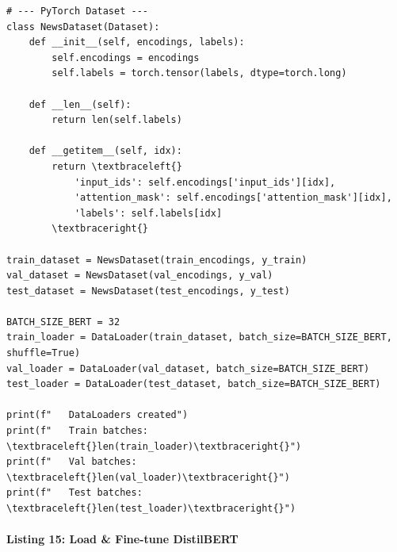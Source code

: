 \documentclass[12pt,a4paper,oneside]{report}
\begin{document}
\begin{Verbatim}[commandchars=\\\{\},breaklines=true,breakanywhere=true,fontsize=\scriptsize,frame=leftline,framesep=2mm,rulecolor=\color{gray}]
# --- PyTorch Dataset ---
class NewsDataset(Dataset):
    def __init__(self, encodings, labels):
        self.encodings = encodings
        self.labels = torch.tensor(labels, dtype=torch.long)

    def __len__(self):
        return len(self.labels)

    def __getitem__(self, idx):
        return \textbraceleft{}
            'input_ids': self.encodings['input_ids'][idx],
            'attention_mask': self.encodings['attention_mask'][idx],
            'labels': self.labels[idx]
        \textbraceright{}

train_dataset = NewsDataset(train_encodings, y_train)
val_dataset = NewsDataset(val_encodings, y_val)
test_dataset = NewsDataset(test_encodings, y_test)

BATCH_SIZE_BERT = 32
train_loader = DataLoader(train_dataset, batch_size=BATCH_SIZE_BERT, shuffle=True)
val_loader = DataLoader(val_dataset, batch_size=BATCH_SIZE_BERT)
test_loader = DataLoader(test_dataset, batch_size=BATCH_SIZE_BERT)

print(f"   DataLoaders created")
print(f"   Train batches: \textbraceleft{}len(train_loader)\textbraceright{}")
print(f"   Val batches:   \textbraceleft{}len(val_loader)\textbraceright{}")
print(f"   Test batches:  \textbraceleft{}len(test_loader)\textbraceright{}")
\end{Verbatim}
\paragraph{Listing 15: Load \& Fine-tune DistilBERT}\mbox{}\\[-1ex]
\end{document}

